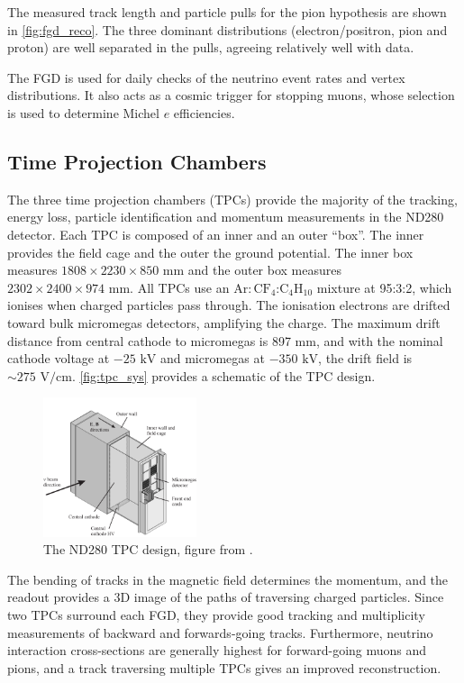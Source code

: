 The measured track length and particle pulls for the pion hypothesis are shown in \autoref{fig:fgd_reco}. The three dominant distributions (electron/positron, pion and proton) are well separated in the pulls, agreeing relatively well with data.

The FGD is used for daily checks of the neutrino event rates and vertex distributions. It also acts as a cosmic trigger for stopping muons, whose selection is used to determine Michel $e$ efficiencies.

\subsection{Time Projection Chambers}
The three time projection chambers (TPCs)\cite{t2k_tpc} provide the majority of the tracking, energy loss, particle identification and momentum measurements in the ND280 detector. Each TPC is composed of an inner and an outer ``box''. The inner provides the field cage and the outer the ground potential. The inner box measures $1808\times2230\times850\text{ mm}$ and the outer box measures $2302\times2400\times974\text{ mm}$.  All TPCs use an $\text{Ar}:\text{CF}_4$:$\text{C}_4\text{H}_{10}$ mixture at 95:3:2, which ionises when charged particles pass through. The ionisation electrons are drifted toward bulk micromegas detectors\cite{micromegas_1, micromegas_2}, amplifying the charge. The maximum drift distance from central cathode to micromegas is 897 mm, and with the nominal cathode voltage at $-25\text{ kV}$ and micromegas at $-350\text{ kV}$, the drift field is $\sim 275\text{ V/cm}$. \autoref{fig:tpc_sys} provides a schematic of the TPC design.
\begin{figure}[h]
	\includegraphics[width=0.4\textwidth, trim={0mm 0mm 0mm 0mm}, clip,page=1]{figures/det_chap/tpc/tpc_1}
	\caption{The ND280 TPC design, figure from \cite{t2k_tpc}.}
	\label{fig:tpc_sys}
\end{figure}

The bending of tracks in the magnetic field determines the momentum, and the readout provides a 3D image of the paths of traversing charged particles. Since two TPCs surround each FGD, they provide good tracking and multiplicity measurements of backward and forwards-going tracks. Furthermore, neutrino interaction cross-sections are generally highest for forward-going muons and pions, and a track traversing multiple TPCs gives an improved reconstruction.

